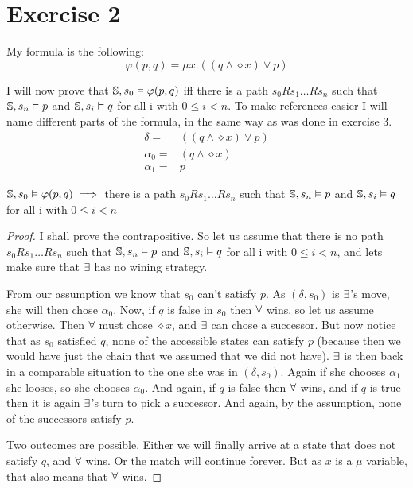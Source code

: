 \section{Exercise 2} 
My formula is the following:
$$\varphi(p,q) = \mu x.((q \land \diamond x)\lor p)$$

I will now prove that $\mathbb{S},s_0 \vDash \varphi(p,q)$ iff there is a path $s_0Rs_1
\dots Rs_n$ such that $\mathbb{S},s_n \vDash p$  and $\mathbb{S},s_i \vDash q$ for all i with $0
\leq i < n$. To make references easier I will name different parts of the
formula, in the same way as was done in exercise 3. 
\begin{align*}
\delta=&((q \land \diamond x)\lor p)\\
\alpha_0=&(q \land \diamond x)\\
\alpha_1=&p
\end{align*}


\begin{theorem}
 $\mathbb{S},s_0 \vDash \varphi(p,q) \implies$ there is a path $s_0Rs_1
\dots Rs_n$ such that $\mathbb{S},s_n \vDash p$  and $\mathbb{S},s_i \vDash q$ for all i with $0\leq i < n$
\end{theorem}
\begin{proof}
  I shall prove the contrapositive. So let us assume that there is no path $s_0Rs_1
\dots Rs_n$ such that $\mathbb{S},s_n \vDash p$  and $\mathbb{S},s_i \vDash q$ for all i with
$0\leq i < n$, and lets make sure that $\exists$ has no wining strategy.

From our assumption we know that $s_0$ can't satisfy $p$. As $(\delta,s_0)$ is
$\exists$'s move, she will then chose $\alpha_0$. Now, if $q$ is false in $s_0$ then
$\forall$ wins, so let us assume otherwise. Then $\forall$ must chose $\diamond x$, and $\exists$
can chose a successor. But now notice that as $s_0$ satisfied $q$, none of the
accessible states can satisfy $p$ (because then we would have just the chain that
we assumed that we did not have). $\exists$ is then back in a comparable situation
to the one she was in  $(\delta,s_0)$. Again if she chooses $\alpha_1$ she
looses, so she chooses $\alpha_0$. And again, if $q$ is false then $\forall$ wins,
and if $q$ is true then it is again $\exists$'s turn to pick a successor. And again,
by the assumption, none of the successors satisfy $p$. 

Two outcomes are
possible. Either we will finally arrive at a state that does not satisfy $q$, and
$\forall$ wins. Or the match will continue forever. But as $x$ is a $\mu$
variable, that also means that $\forall$ wins.

\end{proof}

